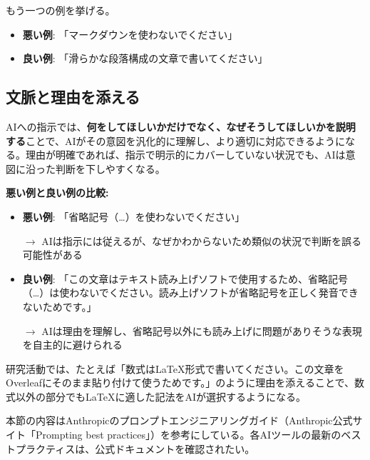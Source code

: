 \vspace{2mm}

もう一つの例を挙げる。

\begin{itemize}
\item \textbf{悪い例}: 「マークダウンを使わないでください」
\item \textbf{良い例}: 「滑らかな段落構成の文章で書いてください」
\end{itemize}

\subsection{文脈と理由を添える}

AIへの指示では、\textbf{何をしてほしいかだけでなく、なぜそうしてほしいかを説明する}ことで、AIがその意図を汎化的に理解し、より適切に対応できるようになる。理由が明確であれば、指示で明示的にカバーしていない状況でも、AIは意図に沿った判断を下しやすくなる。

\vspace{3mm}
\textbf{悪い例と良い例の比較:}
\vspace{2mm}

\begin{itemize}
\item \textbf{悪い例}: 「省略記号（\ldots）を使わないでください」

$\rightarrow$ AIは指示には従えるが、なぜかわからないため類似の状況で判断を誤る可能性がある

\item \textbf{良い例}: 「この文章はテキスト読み上げソフトで使用するため、省略記号（\ldots）は使わないでください。読み上げソフトが省略記号を正しく発音できないためです。」

$\rightarrow$ AIは理由を理解し、省略記号以外にも読み上げに問題がありそうな表現を自主的に避けられる
\end{itemize}

\vspace{2mm}

研究活動では、たとえば「数式は\LaTeX 形式で書いてください。この文章をOverleafにそのまま貼り付けて使うためです。」のように理由を添えることで、数式以外の部分でも\LaTeX に適した記法をAIが選択するようになる。

\begin{screen}
本節の内容はAnthropicのプロンプトエンジニアリングガイド（Anthropic公式サイト「Prompting best practices」）を参考にしている。各AIツールの最新のベストプラクティスは、公式ドキュメントを確認されたい。
\end{screen}

